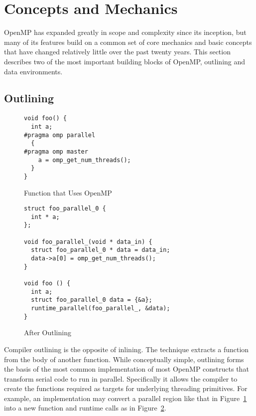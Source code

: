 \section{Concepts and Mechanics}
\label{sec:concepts}

OpenMP has expanded greatly in scope and complexity since its inception, but
many of its features build on a common set of core mechanics and basic concepts
that have changed relatively little over the past twenty years.  This section
describes two of the most important building blocks of OpenMP, outlining and
data environments.

\subsection{Outlining}
\label{sub:outlining}

\begin{figure}
\begin{verbatim}
void foo() {
  int a;
#pragma omp parallel
  {
#pragma omp master
    a = omp_get_num_threads();
  }
}
\end{verbatim}
\caption{Function that Uses OpenMP\label{fig:outline-before}}
\end{figure}

\begin{figure}
\begin{verbatim}
struct foo_parallel_0 {
  int * a;
};

void foo_parallel_(void * data_in) {
  struct foo_parallel_0 * data = data_in;
  data->a[0] = omp_get_num_threads();
}

void foo () {
  int a;
  struct foo_parallel_0 data = {&a};
  runtime_parallel(foo_parallel_, &data);
}
\end{verbatim}
\caption{After Outlining\label{fig:outline-after}}
\end{figure}

Compiler outlining is the opposite of inlining. The technique extracts a
function from the body of another function. While conceptually simple, 
outlining forms the basis of the most common implementation of most OpenMP 
constructs that transform serial code to run in parallel. Specifically it 
allows the compiler to create the functions required as targets for underlying
threading primitives. For example, an implementation may convert a parallel 
region like that in Figure~\ref{fig:outline-before} into a new function 
and runtime calls as in Figure~\ref{fig:outline-after}.

